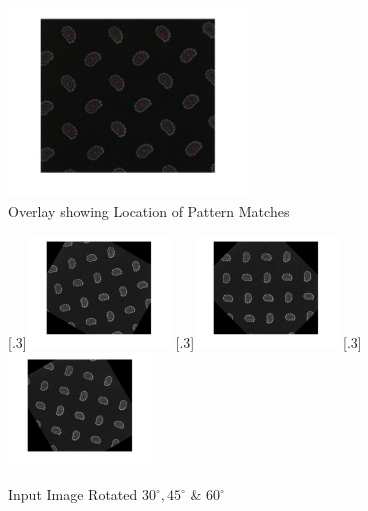 \documentclass[a4paper]{article}
\begin{document}
	\begin{figure}[H]
		\centering
		\includegraphics[height=5cm]{Results/Q3/a/qaOverlay.jpg}%
		\caption{Overlay showing Location of Pattern Matches}
		\label{fig:}
	\end{figure}
	\begin{figure}[H]
		\centering
		[.3\linewidth]{\includegraphics[height=3cm]{Results/Q3/a/qaInputRot30.jpg}}%
		[.3\linewidth]{\includegraphics[height=3cm]{Results/Q3/a/qaInputRot45.jpg}}%
		[.3\linewidth]{\includegraphics[height=3cm]{Results/Q3/a/qaInputRot60.jpg}}%
		\caption{Input Image Rotated $30^\circ, 45^\circ$ \& $60^\circ$}
		\label{fig:}
	\end{figure}
\end{document}
